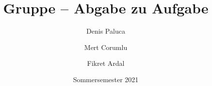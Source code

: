 \documentclass[course=erap]{aspdoc}
\author{Denis Paluca \and Mert Corumlu \and Fikret Ardal}
\date{Sommersemester 2021} %
\title{Gruppe \theGroup{} -- Abgabe zu Aufgabe \theNumber}
\begin{document}
\maketitle









{}
\end{document}
